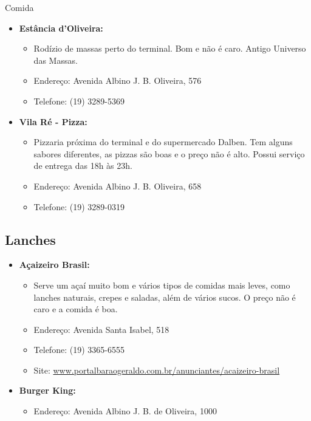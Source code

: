 \begin{story}{Comida}
\begin{itemize}
\item \textbf{Estância d'Oliveira:}
\begin{itemize}
\item Rodízio de massas perto do terminal. Bom e não é caro. Antigo Universo das Massas.
\item Endereço: Avenida Albino J. B. Oliveira, 576
\item Telefone: (19) 3289-5369
\end{itemize}

\item \textbf{Vila Ré - Pizza:}
\begin{itemize}
\item Pizzaria próxima do terminal e do supermercado Dalben. Tem alguns sabores diferentes, as pizzas são boas e o preço não é alto. Possui serviço de entrega das 18h às 23h.
\item Endereço: Avenida Albino J. B. Oliveira, 658
\item Telefone: (19) 3289-0319
\end{itemize}

\end{itemize}

\subsection*{Lanches}

\begin{itemize}

\item \textbf{Açaizeiro Brasil:}
\begin{itemize}
\item Serve um açaí muito bom e vários tipos de comidas mais leves, como lanches naturais, crepes e saladas, além de vários sucos. O preço não é caro e a comida é boa.
\item Endereço: Avenida Santa Isabel, 518
\item Telefone: (19) 3365-6555
\item Site: \url{www.portalbaraogeraldo.com.br/anunciantes/acaizeiro-brasil}
\end{itemize}

\item \textbf{Burger King:}
\begin{itemize}
\item Endereço: Avenida Albino J. B. de Oliveira, 1000
\end{itemize}


\end{itemize}
\end{story}
